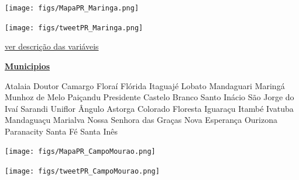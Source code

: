 \documentclass[10pt]{article} %
\begin{document}
\begin{minipage}[t]{.66\linewidth}
\hypertarget{Mrng}{}
\texttt{[image: figs/MapaPR\_Maringa.png]}\vspace{0.5cm}\vspace{0.5cm}\begin{center}
\texttt{[image: figs/tweetPR\_Maringa.png]}\end{center}
\begin{center}

\end{center}
\small{\hyperlink{vartab}{ver descrição das variáveis}}\end{minipage}\hfill\begin{minipage}[t]{.30\linewidth}
\begin{mdframed}[style=sidebar,frametitle={}]
\textbf{\hyperlink{municips}{Municipios}}\begin{itemize}\gsquare Atalaia 
\gsquare Doutor Camargo 
\gsquare Floraí 
\gsquare Flórida 
\gsquare Itaguajé 
\gsquare Lobato 
\gsquare Mandaguari 
\gsquare Maringá 
\gsquare Munhoz de Melo 
\gsquare Paiçandu 
\gsquare Presidente Castelo Branco 
\gsquare Santo Inácio 
\gsquare São Jorge do Ivaí 
\gsquare Sarandi 
\gsquare Uniflor 
\gsquare Ângulo 
\gsquare Astorga 
\gsquare Colorado 
\gsquare Floresta 
\gsquare Iguaraçu 
\gsquare Itambé 
\gsquare Ivatuba 
\gsquare Mandaguaçu 
\gsquare Marialva 
\gsquare Nossa Senhora das Graças 
\gsquare Nova Esperança 
\gsquare Ourizona 
\gsquare Paranacity 
\gsquare Santa Fé 
\gsquare Santa Inês 
\end{itemize}\BackToContents\end{mdframed}\hfill\end{minipage}\newpage\begin{minipage}[t]{.66\linewidth}
\hypertarget{CmpM}{}
\texttt{[image: figs/MapaPR\_CampoMourao.png]}\vspace{0.5cm}\vspace{0.5cm}\begin{center}
\texttt{[image: figs/tweetPR\_CampoMourao.png]}\end{center}
\begin{center}

\end{center}
\end{minipage}
\end{document}
